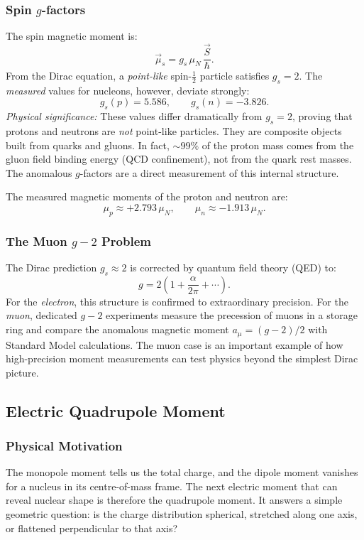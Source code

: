 \subsubsection*{Spin $g$-factors}
The spin magnetic moment is:
\begin{equation}
  \label{eq:spin_magnetic_moment}
  \vec{\mu}_s = g_s\,\mu_N\,\frac{\vec{S}}{\hbar}.
\end{equation}
From the Dirac equation, a \emph{point-like} spin-$\tfrac{1}{2}$ particle satisfies $g_s = 2$.  The \emph{measured} values for nucleons, however, deviate strongly:
\begin{equation}
  \label{eq:gs_values}
  \boxed{g_s(p) = 5.586, \qquad g_s(n) = -3.826.}
\end{equation}
\textit{Physical significance:} These values differ dramatically from $g_s = 2$, proving that protons and neutrons are \emph{not} point-like particles.  They are composite objects built from quarks and gluons.  In fact, $\sim 99\%$ of the proton mass comes from the gluon field binding energy (QCD confinement), not from the quark rest masses.  The anomalous $g$-factors are a direct measurement of this internal structure.

The measured magnetic moments of the proton and neutron are:
\[
  \mu_p \approx +2.793\,\mu_N, \qquad \mu_n \approx -1.913\,\mu_N.
\]

\subsubsection*{The Muon $g-2$ Problem}
The Dirac prediction $g_s \approx 2$ is corrected by quantum field theory (QED) to:
\[
  g = 2\left(1 + \frac{\alpha}{2\pi} + \cdots\right).
\]
For the \emph{electron}, this structure is confirmed to extraordinary precision.  For the \emph{muon}, dedicated $g-2$ experiments measure the precession of muons in a storage ring and compare the anomalous magnetic moment \(a_\mu=(g-2)/2\) with Standard Model calculations.  The muon case is an important example of how high-precision moment measurements can test physics beyond the simplest Dirac picture.


\subsection*{Electric Quadrupole Moment}

\subsubsection*{Physical Motivation}
The monopole moment tells us the total charge, and the dipole moment vanishes for a nucleus in its centre-of-mass frame.  The next electric moment that can reveal nuclear shape is therefore the quadrupole moment.  It answers a simple geometric question: is the charge distribution spherical, stretched along one axis, or flattened perpendicular to that axis?

